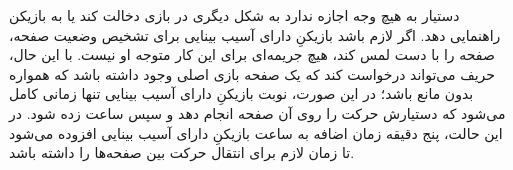 دستیار به هیچ وجه اجازه ندارد به شکل دیگری در بازی دخالت کند یا به بازیکن راهنمایی دهد. اگر لازم باشد بازیکنِ دارای آسیب بینایی برای تشخیص وضعیت صفحه، صفحه را با دست لمس کند، هیچ جریمه‌ای برای این کار متوجه او نیست. با این حال، حریف می‌تواند درخواست کند که یک صفحه بازی اصلی وجود داشته باشد که همواره بدون مانع باشد؛ در این صورت، نوبت بازیکنِ دارای آسیب بینایی تنها زمانی کامل می‌شود که دستیارش حرکت را روی آن صفحه انجام دهد و سپس ساعت زده شود. در این حالت، پنج دقیقه زمان اضافه به ساعت بازیکنِ دارای آسیب بینایی افزوده می‌شود تا زمان لازم برای انتقال حرکت بین صفحه‌ها را داشته باشد.
